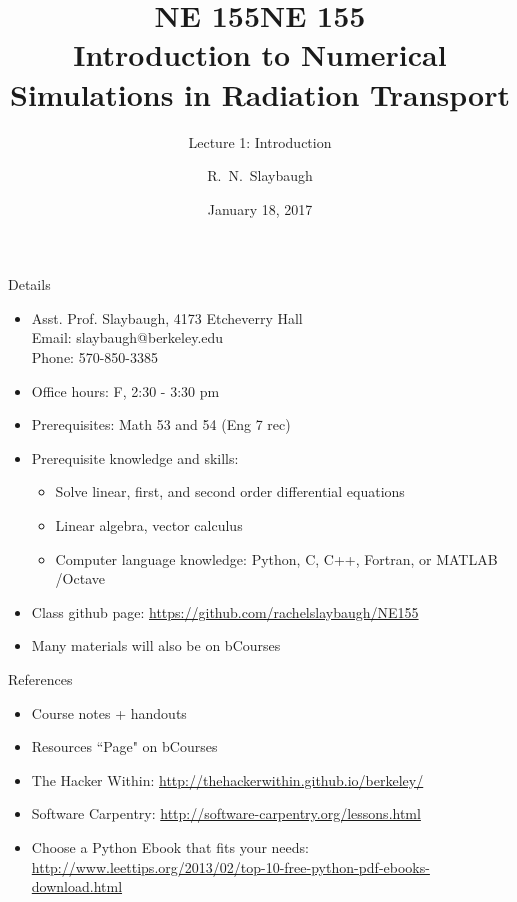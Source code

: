 \documentclass[xcolor=x11names,compress]{beamer}
\title{NE 155}
\author{R.\ N.\ Slaybaugh}
\date{January 18, 2017}
\renewcommand{\(}{\begin{columns}}
\renewcommand{\)}{\end{columns}}
\newcommand{\<}[1]{\begin{column}{#1}}
\renewcommand{\>}{\end{column}}
\begin{document}
\begin{frame}
\title{NE 155\\Introduction to Numerical Simulations in Radiation Transport}
\subtitle{Lecture 1: Introduction}
\titlepage
\end{frame}

\begin{frame}{Details}
\begin{itemize}
\item Asst. Prof. Slaybaugh, 4173 Etcheverry Hall\\
      Email: slaybaugh@berkeley.edu \\
      Phone: 570-850-3385
\item Office hours: F, 2:30 - 3:30 pm
\item Prerequisites: Math 53 and 54 (Eng 7 rec)
\item Prerequisite knowledge and skills: 
\begin{itemize}
\item Solve linear, first, and second order differential equations
\item Linear algebra, vector calculus
\item Computer language knowledge: Python, C, C++, Fortran, or MATLAB	/Octave
\end{itemize}
\item Class github page: \href{https://github.com/rachelslaybaugh/NE155}{https://github.com/rachelslaybaugh/NE155}
\item Many materials will also be on bCourses
\end{itemize}
\end{frame}

\begin{frame}{References}
\begin{itemize}
\item Course notes + handouts
\item Resources ``Page" on bCourses
\item The Hacker Within: \href{http://thehackerwithin.github.io/berkeley/}{http://thehackerwithin.github.io/berkeley/}
\item Software Carpentry: \href{http://software-carpentry.org/lessons.html}{http://software-carpentry.org/lessons.html}
\item Choose a Python Ebook that fits your needs:
\href{http://www.leettips.org/2013/02/top-10-free-python-pdf-ebooks-download.html}{http://www.leettips.org/2013/02/top-10-free-python-pdf-ebooks-download.html}
\end{itemize}
\end{frame}
\end{document}

